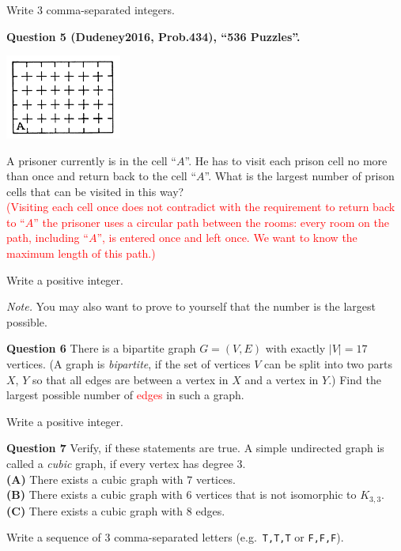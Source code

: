 \documentclass[jou]{apa6}
\begin{document}
Write $3$ comma-separated integers.



\vspace{10pt}
{\bf Question 5 (Dudeney2016, Prob.434), ``536 Puzzles''.}
\begin{center}
\includegraphics[width=1.5in]{prison-cells.png}
\end{center}
A prisoner currently is in the cell ``$A$''. He has to visit each 
prison cell no more than once and return 
back to the cell ``$A$''. What is the largest number of prison cells that
can be visited in this way?\\
\textcolor{red}{(Visiting each cell once does not contradict with the requirement to return back 
to ``$A$'' \textendash{} the prisoner uses a circular path between the rooms: 
every room on the path, including ``$A$'', is entered once and left once. We want
to know the maximum length of this path.)}

Write a positive integer.

{\em Note.} You may also want to prove to yourself that the number is the largest possible.


\vspace{10pt}
{\bf Question 6}
There is a bipartite graph $G=(V,E)$ with exactly $|V| = 17$ vertices. (A graph is {\em bipartite}, if 
the set of vertices $V$ can be split into two parts $X$, $Y$ so that all edges are between a vertex in $X$ and a vertex in $Y$.)
Find the largest possible number of \textcolor{red}{edges} in such a graph. 

Write a positive integer.
 

\vspace{10pt}
{\bf Question 7} Verify, if these statements are true. 
A simple undirected graph is called a {\em cubic} graph, 
if every vertex has degree $3$.\\
{\bf (A)} There exists a cubic graph with $7$ vertices.\\
{\bf (B)} There exists a cubic graph with $6$ vertices that is not isomorphic to $K_{3,3}$.\\
{\bf (C)} There exists a cubic graph with $8$ edges.

Write a sequence of 3 comma-separated letters (e.g.\ {\tt T,T,T} or {\tt F,F,F}).
\end{document}
